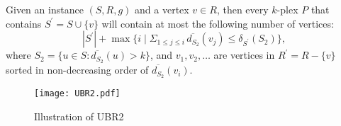 \documentclass[sigconf, nonacm]{acmart}
\begin{document}
\begin{theorem}\label{th:ubr2}
Given an instance $(S, R, g)$ and a vertex $v \in R$, then every $k$-plex $P$ that contains $S^\prime = S \cup \{ v \}$ will contain at most the following number of vertices:
$$
| S^\prime | +  \max \big\{ i \mid \Sigma_{1 \leq j \leq i}\,\overline{d_{S_2}}(v_j) \leq \delta_{ S^\prime } (S_2) \big\},
$$
where $S_2 = \{ u \in S : \overline{d_{S_2}}(u)  > k\}$, and $v_1, v_2, \ldots$ are vertices in $R^\prime = R - \{v\}$ sorted in non-decreasing order of $ \overline{d_{S_2}}(v_i)$.
\end{theorem}

\begin{figure}[t]
  \texttt{[image: UBR2.pdf]}
  \caption{Illustration of UBR2}\label{fig:UBR2}
   \vspace{3mm}
\end{figure}
\end{document}
